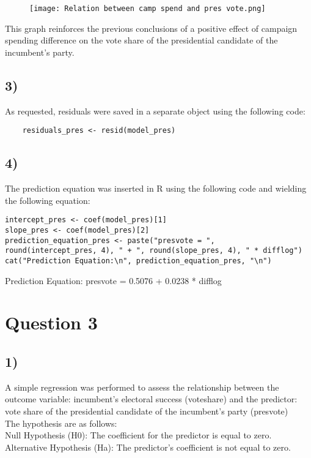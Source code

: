 \documentclass[oneside]{article}
\begin{document}
\begin{figure} [h]
    \centering
    \texttt{[image: Relation between camp spend and pres vote.png]}
        
\end{figure}

This graph reinforces the previous conclusions of a positive effect of campaign spending difference on the vote share of the presidential candidate of the incumbent's party.

\subsection*{3)}
As requested, residuals were saved in a separate object using the following code:
\begin{verbatim}
    residuals_pres <- resid(model_pres)
\end{verbatim}

\subsection*{4)}
The prediction equation was inserted in R using the following code and wielding the following equation:
\begin{verbatim}
intercept_pres <- coef(model_pres)[1]  
slope_pres <- coef(model_pres)[2]      
prediction_equation_pres <- paste("presvote = ",
round(intercept_pres, 4), " + ", round(slope_pres, 4), " * difflog")
cat("Prediction Equation:\n", prediction_equation_pres, "\n")
\end{verbatim}

Prediction Equation:
 presvote =  0.5076  +  0.0238  * difflog 

\section*{Question 3}
\subsection*{1)}
A simple regression was performed to assess the relationship between the outcome variable: incumbent's electoral success (voteshare) and the predictor: vote share of the presidential candidate of the incumbent's party (presvote)
\\
The hypothesis are as follows:\\
Null Hypothesis (H0): The coefficient for the predictor is equal to zero.\\
Alternative Hypothesis (Ha): The predictor's coefficient is not equal to zero.
\end{document}
